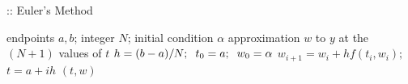 \documentclass[12pt,oneside]{book}
\begin{document}
\begin{spacing}{1.2}
				\begin{algorithm}[H]
					\caption{:: Euler's Method}
					\begin{algorithmic}[1]
						\REQUIRE endpoints $ a, b $; \hspace*{0.2cm} integer $ N $; \hspace*{0.2cm} initial condition $ \alpha $
						\ENSURE approximation $ w $ to $ y $ at the $ (N + 1) $ values of $ t $
						\STATE $ h = (b - a) / N; \hspace*{0.2cm} t_0 = a; \hspace*{0.2cm} w_{0} = \alpha $
							\STATE $ w_{i+1} = w_{i} + hf(t_{i},w_{i}); $ \hspace*{0.5cm} 
							\STATE $ t = a + ih $ \hspace*{0.5cm} 
						\ENDFOR
						\RETURN $ (t, w) $
					\end{algorithmic}
				\end{algorithm}
			
		\end{spacing}

	\clearpage
\end{document}
